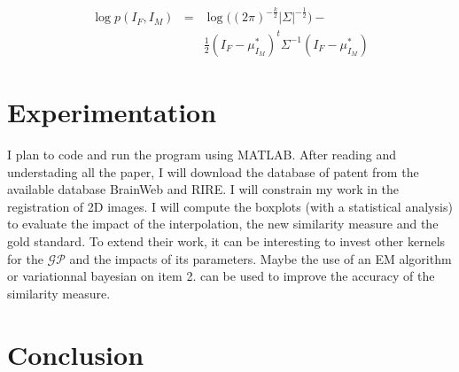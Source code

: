 \documentclass[10pt,twocolumn,letterpaper]{article}
\begin{document}
\begin{equation}
\begin{array} {lcl} 
\log p(I_F,I_M) &=& \log\big( (2\pi)^{-\frac{k}{2}}|\Sigma|^{-\frac{1}{2}}\big)- \\
 & & \frac{1}{2}(I_F-\mu_{I_M}^*)^t\Sigma^{-1}(I_F-\mu_{I_M}^*)
\end{array}
\end{equation}

\section{Experimentation}\label{sec:exp}

I plan to code and run the program using MATLAB.
After reading and understading all the paper, I will download the database of patent from the available database BrainWeb and RIRE.
I will constrain my work in the registration of 2D images. I will compute the boxplots (with a statistical analysis) to evaluate the impact of the interpolation, the new similarity measure and the gold standard.
To extend their work, it can be interesting to invest other kernels for the $\mathcal{GP}$ and the impacts of its parameters. Maybe the use of an EM algorithm or variationnal bayesian on item 2. can be used to improve the accuracy of the similarity measure.

\section{Conclusion}\label{sec:concl}

{\small


}
\end{document}
